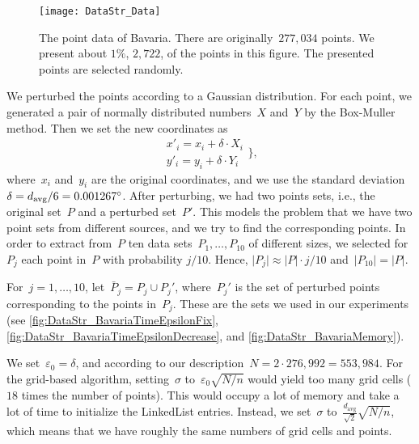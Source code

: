 \begin{figure}[tb]
	\centering
	\texttt{[image: DataStr\_Data]}
	\caption{The point data of Bavaria. 
		There are originally~$277{,}034$ points.
		We present about $1\%$, $2{,}722$, 
		of the points in this figure.
		The presented points are selected randomly.
	}
	\label{fig:DataStr_RealData}
\end{figure}



We perturbed the points according to a Gaussian distribution. 
For each point, we generated 
a pair of normally distributed numbers~$X$ and~$Y$ 
by the Box-Muller method. 
Then we set the new coordinates as
\begin{equation}
\begin{array}{l}
x'_i=x_i+\delta \cdot X_i  \\ 
y'_i=y_i+\delta \cdot Y_i
\end{array}
\bigg\}, \nonumber
\end{equation}
where~$x_i$ and~$y_i$ are the original coordinates, 
and we use the standard 
deviation~$\delta =d_\mathrm{avg}/6=0.001267 \degree$. 
After perturbing, we had two points sets, 
i.e., the original set~$P$ and a perturbed set~$P'$. 
This models the problem that we have two point sets from 
different sources, and 
we try to find the corresponding points. 
In order to extract from~$P$ 
ten data sets~$P_{1},\ldots,P_{10}$ of different sizes, 
we selected for~$P_{j}$ each point in~$P$ 
with probability $j/10$. 
Hence, $\vert P_{j}\vert \approx \vert P\vert \cdot j/10$ 
and~$\vert P_{10}\vert =\vert P\vert$.


For~$j=1,\ldots ,10$, let~$\bar{P}_{j}=P_{j}\cup P_{j}'$,
where~$P_{j}'$ is the set of perturbed points 
corresponding to the points in~$P_{j}$. 
These are the sets we used in our experiments
(see \figs\ref{fig:DataStr_BavariaTimeEpsilonFix}, 
\ref{fig:DataStr_BavariaTimeEpsilonDecrease}, and 
\ref{fig:DataStr_BavariaMemory}).



We set~$\varepsilon_{0}=\delta$, 
and according to our description~$N=2\cdot 276{,}992=553{,}984$. 
For the grid-based algorithm, 
setting~$\sigma$ to~$\varepsilon _{0}\sqrt{N/n}$ 
would yield too many grid cells 
($18$ times the number of points). 
This would occupy a lot of memory 
and take a lot of time to initialize the LinkedList entries. 
Instead, we set~$\sigma$ 
to~$\frac{d_\mathrm{avg}}{\sqrt{2}}\sqrt{N/n}$, 
which means that 
we have roughly the same numbers of grid cells and points.



